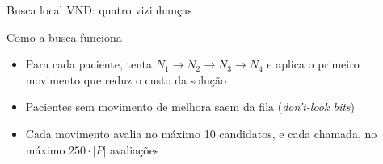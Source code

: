 \documentclass[aspectratio=169,10pt]{beamer}
\begin{document}
\begin{frame}{Busca local VND: quatro vizinhanças}
    \vspace{0.45cm}
    \begin{block}{Como a busca funciona}
        \begin{itemize}
            \item Para cada paciente, tenta $N_1 \rightarrow N_2 \rightarrow N_3 \rightarrow N_4$ e aplica o primeiro movimento que reduz o custo da solução
            \item Pacientes sem movimento de melhora saem da fila (\textit{don't-look bits})
            \item Cada movimento avalia no máximo 10 candidatos, e cada chamada, no máximo $250 \cdot |P|$ avaliações
        \end{itemize}
    \end{block}
\end{frame}
\end{document}
